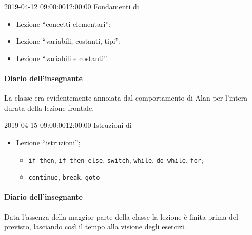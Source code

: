 \documentclass[twoside, symmetric]{tufte-book}
\begin{document}
\begin{lezione}
	{2019-04-12}
	{09:00:00}{12:00:00}
	{Fondamenti di \Cpp}

\begin{itemize}
	\item Lezione ``concetti elementari'';
	\item Lezione ``variabili, costanti, tipi'';
	\item Lezione ``variabili e costanti''.
\end{itemize}

\paragraph{Diario dell'insegnante}
La classe era evidentemente annoiata dal comportamento di Alan per l'intera durata della lezione frontale.


\end{lezione}

\begin{lezione}
	{2019-04-15}
	{09:00:00}{12:00:00}
	{Istruzioni di \Cpp}

\begin{itemize}
	\item Lezione ``istruzioni'';
	\begin{itemize}
		\item \texttt{if-then}, \texttt{if-then-else}, \texttt{switch}, \texttt{while}, \texttt{do-while}, \texttt{for};
		\item \texttt{continue}, \texttt{break}, \texttt{goto}
	\end{itemize}
\end{itemize}

\paragraph{Diario dell'insegnante}
Data l'assenza della maggior parte della classe la lezione è finita prima del previsto, lasciando così il tempo alla visione degli esercizi.


\end{lezione}
\end{document}
